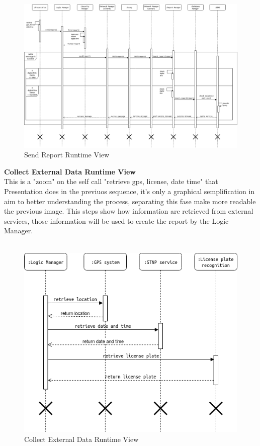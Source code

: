 \documentclass{article}
\begin{document}
\begin{figure}[H]
    \centering
    \includegraphics[scale=0.3]{img/sequence_diagrams/send_report_sequence.png}
    \caption{Send Report Runtime View}
\end{figure}  
\clearpage
\textbf{Collect External Data Runtime View}\\  
This is a "zoom" on the self call "retrieve gps, license, date time" that Presentation does in the 
previuos sequence, it's only a graphical semplification in aim to better understanding the process, 
separating this fase make more readable the previous image. This steps show how information are 
retrieved from external services, those information will be used to create the report by the Logic Manager.
\\
\\
\begin{figure}[H]
    \centering
    \includegraphics[scale=0.6]{img/sequence_diagrams/collect_external_data_sequence.png}
    \caption{Collect External Data Runtime View}
\end{figure}
\end{document}
